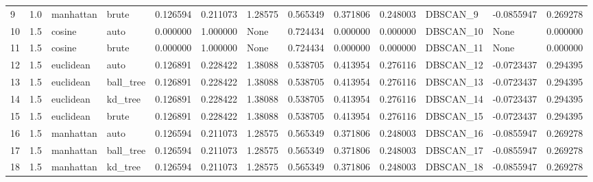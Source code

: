 \begin{tabular}{lrllrrlrrrllr}
9  &  1.0 &  manhattan &      brute &             0.126594 &            0.211073 &              1.28575 &               0.565349 &           0.371806 &           0.248003 &   DBSCAN\_9 &       -0.0855947 &         0.269278 \\
10 &  1.5 &     cosine &       auto &             0.000000 &            1.000000 &                 None &               0.724434 &           0.000000 &           0.000000 &  DBSCAN\_10 &             None &         0.000000 \\
11 &  1.5 &     cosine &      brute &             0.000000 &            1.000000 &                 None &               0.724434 &           0.000000 &           0.000000 &  DBSCAN\_11 &             None &         0.000000 \\
12 &  1.5 &  euclidean &       auto &             0.126891 &            0.228422 &              1.38088 &               0.538705 &           0.413954 &           0.276116 &  DBSCAN\_12 &       -0.0723437 &         0.294395 \\
13 &  1.5 &  euclidean &  ball\_tree &             0.126891 &            0.228422 &              1.38088 &               0.538705 &           0.413954 &           0.276116 &  DBSCAN\_13 &       -0.0723437 &         0.294395 \\
14 &  1.5 &  euclidean &    kd\_tree &             0.126891 &            0.228422 &              1.38088 &               0.538705 &           0.413954 &           0.276116 &  DBSCAN\_14 &       -0.0723437 &         0.294395 \\
15 &  1.5 &  euclidean &      brute &             0.126891 &            0.228422 &              1.38088 &               0.538705 &           0.413954 &           0.276116 &  DBSCAN\_15 &       -0.0723437 &         0.294395 \\
16 &  1.5 &  manhattan &       auto &             0.126594 &            0.211073 &              1.28575 &               0.565349 &           0.371806 &           0.248003 &  DBSCAN\_16 &       -0.0855947 &         0.269278 \\
17 &  1.5 &  manhattan &  ball\_tree &             0.126594 &            0.211073 &              1.28575 &               0.565349 &           0.371806 &           0.248003 &  DBSCAN\_17 &       -0.0855947 &         0.269278 \\
18 &  1.5 &  manhattan &    kd\_tree &             0.126594 &            0.211073 &              1.28575 &               0.565349 &           0.371806 &           0.248003 &  DBSCAN\_18 &       -0.0855947 &         0.269278 \\

\end{tabular}
